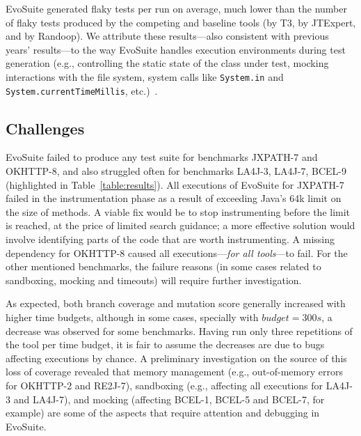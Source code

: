 \documentclass[10pt,conference]{IEEEtran}
\newcommand{\EVOSUITE}{{\sc EvoSuite}\xspace}
\begin{document}
\EVOSUITE generated \FlakyEvosuite flaky tests per run on average,
much lower than the number of flaky tests produced by the competing
and baseline tools (\FlakyTthree by T3, \FlakyJtexpert by JTExpert, and
\FlakyRandoop by Randoop). We attribute these results---also
consistent with previous years' results---to the way \EVOSUITE handles
execution environments during test generation (e.g., controlling the
static state of the class under test, mocking interactions with the
file system, system calls like \texttt{System.in} and
\texttt{System.currentTimeMillis}, etc.)~\cite{arcuri2014automated}.


\subsection{Challenges}

\EVOSUITE failed to produce any test suite for benchmarks JXPATH-7 and
OKHTTP-8, and also struggled often for benchmarks LA4J-3, LA4J-7,
BCEL-9 (highlighted in Table~\ref{table:results}). All executions of
\EVOSUITE for JXPATH-7 failed in the instrumentation phase as a result
of exceeding Java's 64k limit on the size of methods. A viable fix
would be to stop instrumenting before the limit is reached, at the
price of limited search guidance; a more effective solution would
involve identifying parts of the code that are worth instrumenting. A
missing dependency for OKHTTP-8 caused all executions---\emph{for all
  tools}---to fail. For the other mentioned benchmarks, the failure
reasons (in some cases related to sandboxing, mocking and timeouts)
will require further investigation.

As expected, both branch coverage and mutation score generally
increased with higher time budgets, although in some cases, specially
with $budget=300s$, a decrease was observed for some
benchmarks. Having run only three repetitions of the tool per time
budget, it is fair to assume the decreases are due to bugs affecting
executions by chance. A preliminary investigation on the source of
this loss of coverage revealed that memory management (e.g.,
out-of-memory errors for OKHTTP-2 and RE2J-7), sandboxing (e.g.,
affecting all executions for LA4J-3 and LA4J-7), and mocking
(affecting BCEL-1, BCEL-5 and BCEL-7, for example) are some of the
aspects that require attention and debugging in \EVOSUITE.
\end{document}
